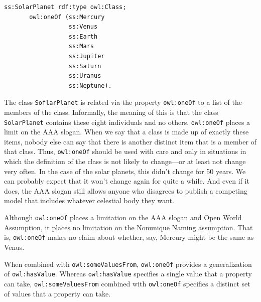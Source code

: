 \begin{lstlisting}
ss:SolarPlanet rdf:type owl:Class; 
       owl:oneOf (ss:Mercury
                  ss:Venus
                  ss:Earth
                  ss:Mars
                  ss:Jupiter
                  ss:Saturn
                  ss:Uranus
                  ss:Neptune).
\end{lstlisting}

The class \texttt{SoflarPlanet} is related via the property \texttt{owl:oneOf} to a list of
the members of the class. Informally, the meaning of this is that the
class \texttt{SolarPlanet} contains these eight individuals and no others.
\texttt{owl:oneOf} places a limit on the AAA slogan. When we say that a class is
made up of exactly these items, nobody else can say that there is
another distinct item that is a member of that class. Thus, \texttt{owl:oneOf}
should be used with care and only in situations in which the definition
of the class is not likely to change---or at least not change very
often. In the case of the solar planets, this didn't change for 50
years. We can probably expect that it won't change again for quite a
while.  And even if it does, the AAA slogan still allows anyone who disagrees to publish a competing model 
that includes whatever celestial body they want. 

Although \texttt{owl:oneOf} places a limitation on the AAA slogan and Open World
Assumption, it places no limitation on the Nonunique Naming assumption.
That is, \texttt{owl:oneOf} makes no claim about whether, say, Mercury might be
the same as Venus.

When combined with \texttt{owl:someValuesFrom}, \texttt{owl:oneOf} provides a
generalization of \texttt{owl:hasValue}. Whereas \texttt{owl:hasValue} specifies a single
value that a property can take, \texttt{owl:someValuesFrom} combined with
\texttt{owl:oneOf} specifies a distinct set of values that a property can take.


